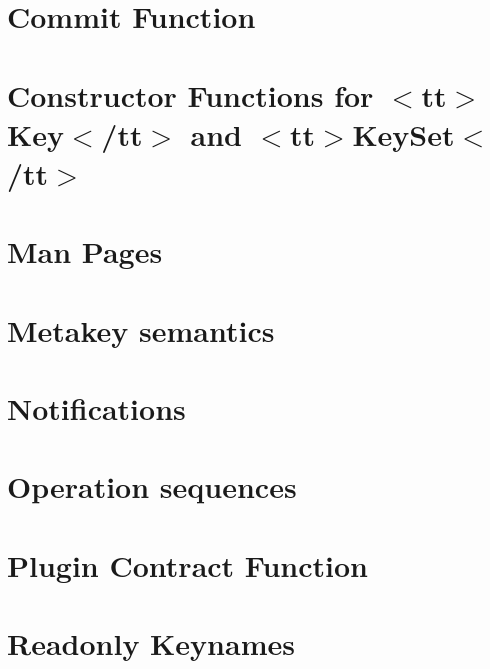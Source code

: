 \let\mypdfximage\pdfximage\def\pdfximage{\immediate\mypdfximage}\documentclass[twoside]{book}
\newcommand{\+}{\discretionary{\mbox{\scriptsize$\hookleftarrow$}}{}{}}
\begin{document}
\chapter{Commit Function}
\label{doc_decisions_0_drafts_commit_function_md}

\chapter{Constructor Functions for $<$tt$>$Key$<$/tt$>$ and $<$tt$>$Key\+Set$<$/tt$>$}
\label{doc_decisions_0_drafts_constructor_functions_md}

\chapter{Man Pages}
\label{doc_decisions_0_drafts_man_pages_md}

\chapter{Metakey semantics}
\label{doc_decisions_0_drafts_metakey_semantics_md}

\chapter{Notifications}
\label{doc_decisions_0_drafts_notifications_md}

\chapter{Operation sequences}
\label{doc_decisions_0_drafts_operation_sequences_md}

\chapter{Plugin Contract Function}
\label{doc_decisions_0_drafts_plugin_contract_function_md}

\chapter{Readonly Keynames}
\label{doc_decisions_0_drafts_readonly_keynames_md}

\end{document}
